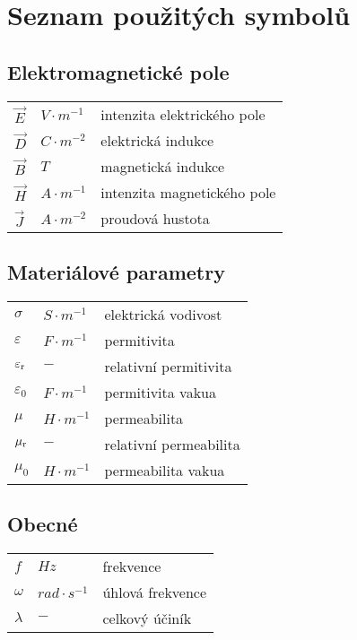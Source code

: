 \chapter*{Seznam použitých symbolů}

\section*{Elektromagnetické pole}
\begin{tabular}{lll}
	$\vec{E}$ & $\unit{V\cdot m^{-1}}$ & intenzita elektrického pole\\
	$\vec{D}$ & $\unit{C\cdot m^{-2}}$ & elektrická indukce\\
	$\vec{B}$ & $\unit{T}$ & magnetická indukce\\
	$\vec{H}$ & $\unit{A\cdot m^{-1}}$ & intenzita magnetického pole\\
    $\vec{J}$ & $\unit{A\cdot m^{-2}}$ & proudová hustota\\
\end{tabular}

\section*{Materiálové parametry}
\begin{tabular}{lll}
	$\sigma$ & $\unit{S\cdot m^{-1}}$ & elektrická vodivost\\
	$\varepsilon$ & $\unit{F\cdot m^{-1}}$ & permitivita\\
	$\varepsilon_{\rm{r}}$ & $\unit{-}$ & relativní permitivita\\
    $\varepsilon_0$ & $\unit{F\cdot m^{-1}}$ & permitivita vakua\\
	$\mu$ & $\unit{H\cdot m^{-1}}$ & permeabilita\\
	$\mu_{\rm{r}}$ & $\unit{-}$ & relativní permeabilita\\
	$\mu_0$ & $\unit{H\cdot m^{-1}}$ & permeabilita vakua\\
\end{tabular}

\section*{Obecné}
\begin{tabular}{lll}
	$f$ & $\unit{Hz}$ & frekvence\\
	$\omega$ & $\unit{rad\cdot s^{-1}}$ & úhlová frekvence\\
	$\lambda$ & $\unit{-}$ & celkový účiník\\
\end{tabular}